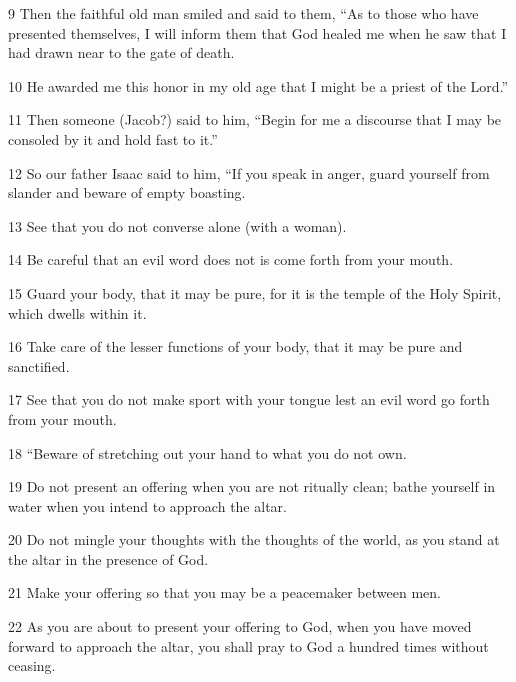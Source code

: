 \par 9 Then the faithful old man smiled and said to them, “As to those who have presented themselves, I will inform them that God healed me when he saw that I had drawn near to the gate of death. 

\par 10 He awarded me this honor in my old age that I might be a priest of the Lord.”

\par 11 Then someone (Jacob?) said to him, “Begin for me a discourse that I may be consoled by it and hold fast to it.” 

\par 12 So our father Isaac said to him, “If you speak in anger, guard yourself from slander and beware of empty boasting. 

\par 13 See that you do not converse alone (with a woman).

\par 14 Be careful that an evil word does not is come forth from your mouth. 

\par 15 Guard your body, that it may be pure, for it is the temple of the Holy Spirit, which dwells within it. 

\par 16 Take care of the lesser functions of your body, that it may be pure and sanctified. 

\par 17 See that you do not make sport with your tongue lest an evil word go forth from your mouth. 

\par 18 “Beware of stretching out your hand to what you do not own. 

\par 19 Do not present an offering when you are not ritually clean; bathe yourself in water when you intend to approach the altar. 

\par 20 Do not mingle your thoughts with the thoughts of the world, as you stand at the altar in the presence of God. 

\par 21 Make your offering so that you may be a peacemaker between men. 

\par 22 As you are about to present your offering to God, when you have moved forward to approach the altar, you shall pray to God a hundred times without ceasing. 

